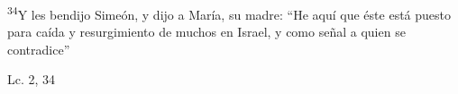 \documentclass[../../rosario.tex]{subfiles}
\begin{document}
    \textsuperscript{34}Y les bendijo Simeón, y dijo a María, su madre: ``He aquí que éste está puesto para caída y resurgimiento de muchos en Israel, y como
    señal a quien se contradice''
    \begin{flushright}
    Lc. 2, 34       
    \end{flushright}
\end{document}
